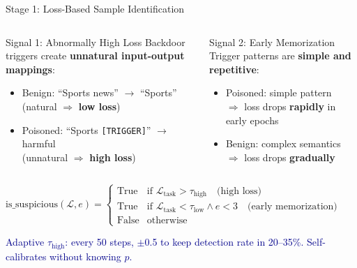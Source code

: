 \documentclass[aspectratio=169, 11pt]{beamer}
\newcommand{\takeaway}[1]{%
\vfill
\begin{center}
\colorbox{darkblue!8}{\parbox{0.92\textwidth}{\centering\small\textcolor{darkblue}{#1}}}
\end{center}
}
\begin{document}
\begin{frame}{Stage 1: Loss-Based Sample Identification}
\vspace{4pt}
\begin{columns}[T]
\begin{block}{Signal 1: Abnormally High Loss}
\small
Backdoor triggers create \textbf{unnatural input-output mappings}:
\begin{itemize}\setlength{\itemsep}{2pt}
  \item Benign: ``Sports news'' $\to$ ``Sports'' \\{\scriptsize (natural $\Rightarrow$ \textbf{low loss})}
  \item Poisoned: ``Sports \texttt{[TRIGGER]}'' $\to$ harmful \\{\scriptsize (unnatural $\Rightarrow$ \textbf{high loss})}
\end{itemize}
\end{block}

\begin{block}{Signal 2: Early Memorization}
\small
Trigger patterns are \textbf{simple and repetitive}:
\begin{itemize}\setlength{\itemsep}{2pt}
  \item Poisoned: simple pattern\\$\Rightarrow$ loss drops \textbf{rapidly} in early epochs
  \item Benign: complex semantics\\$\Rightarrow$ loss drops \textbf{gradually}
\end{itemize}
\end{block}
\end{columns}

\vspace{2pt}
\begin{center}
$\text{is\_suspicious}(\mathcal{L}, e) = \begin{cases}
\text{True} & \text{if } \mathcal{L}_{\text{task}} > \tau_{\text{high}} \quad \text{(high loss)}\\[2pt]
\text{True} & \text{if } \mathcal{L}_{\text{task}} < \tau_{\text{low}} \wedge e < 3 \quad \text{(early memorization)}\\[2pt]
\text{False} & \text{otherwise}
\end{cases}$
\end{center}
\vspace{-2pt}
\takeaway{Adaptive $\tau_{\text{high}}$: every 50 steps, $\pm$0.5 to keep detection rate in 20--35\%. Self-calibrates without knowing $p$.}
\end{frame}
\end{document}
